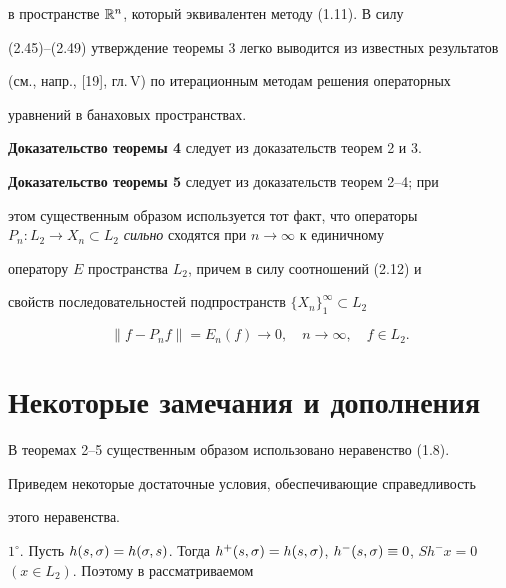 в пространстве $\Bbb R^n$, который эквивалентен методу (1.11). В силу


(2.45)--(2.49) утверждение теоремы 3 легко выводится из известных результатов


(см., напр., [19], гл.\,V) по итерационным методам решения операторных


уравнений в банаховых пространствах.


\medskip





{\bf Доказательство теоремы 4 } следует из доказательств теорем 2 и 3.


\medskip





{\bf Доказательство теоремы 5} следует из доказательств теорем 2--4; при


этом существенным образом используется тот факт, что операторы $P_n:L_2\to


X_n\subset L_2$ {\it сильно } сходятся при $n\to \infty$ к единичному


оператору $E$ пространства $L_2$, причем в силу соотношений (2.12) и


свойств последовательностей подпространств $\{X_n\}_1^{\infty}\subset L_2$


$$


\|f-P_nf\| = E_n(f) \to 0,\quad n\to \infty, \quad f\in L_2.


$$








\section{Некоторые замечания и дополнения}





В теоремах 2--5 существенным образом использовано неравенство (1.8).


Приведем некоторые достаточные условия, обеспечивающие справедливость


этого неравенства.





$1^\circ$. Пусть $h(s,\si)=h(\si,s)$. Тогда $h^+(s,\si)=h(s,\si)$, $h^-


(s,\si)\equiv 0$, $Sh^-x = 0$ $(x\in L_2)$. Поэтому в рассматриваемом


